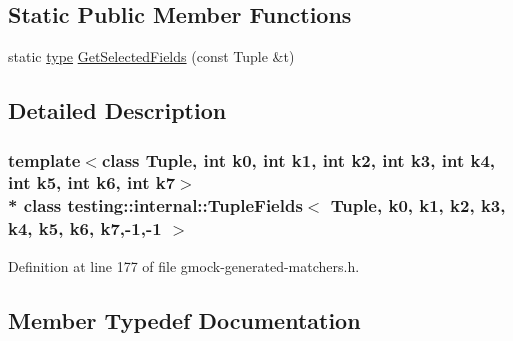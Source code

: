 \subsection*{Static Public Member Functions}
\begin{DoxyCompactItemize}
\item 
static \hyperlink{classtesting_1_1internal_1_1_tuple_fields_3_01_tuple_00_01k0_00_01k1_00_01k2_00_01k3_00_01k4_00_0063f8a87602abfee3b4568185bc2c75_a391bb0758025c4f9238011be4bf6c1d1}{type} \hyperlink{classtesting_1_1internal_1_1_tuple_fields_3_01_tuple_00_01k0_00_01k1_00_01k2_00_01k3_00_01k4_00_0063f8a87602abfee3b4568185bc2c75_aef8634866510cb440f26ec78f46538d5}{Get\+Selected\+Fields} (const Tuple \&t)
\end{DoxyCompactItemize}


\subsection{Detailed Description}
\subsubsection*{template$<$class Tuple, int k0, int k1, int k2, int k3, int k4, int k5, int k6, int k7$>$\\*
class testing\+::internal\+::\+Tuple\+Fields$<$ Tuple, k0, k1, k2, k3, k4, k5, k6, k7,-\/1,-\/1 $>$}



Definition at line 177 of file gmock-\/generated-\/matchers.\+h.



\subsection{Member Typedef Documentation}
